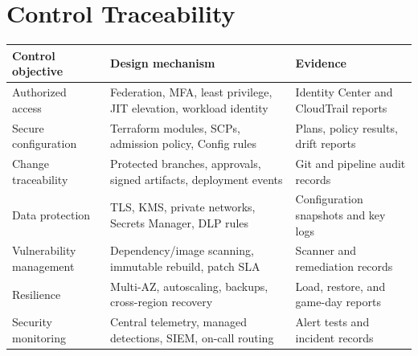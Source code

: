 \section{Control Traceability}

\begin{tabularx}{\textwidth}{@{}L{31mm}Y L{45mm}@{}}
  \toprule
  \color{white}\textbf{Control objective} & \color{white}\textbf{Design mechanism} & \color{white}\textbf{Evidence} \\
  \midrule
  Authorized access & Federation, MFA, least privilege, JIT elevation, workload identity & Identity Center and CloudTrail reports \\
  Secure configuration & Terraform modules, SCPs, admission policy, Config rules & Plans, policy results, drift reports \\
  Change traceability & Protected branches, approvals, signed artifacts, deployment events & Git and pipeline audit records \\
  Data protection & TLS, KMS, private networks, Secrets Manager, DLP rules & Configuration snapshots and key logs \\
  Vulnerability management & Dependency/image scanning, immutable rebuild, patch SLA & Scanner and remediation records \\
  Resilience & Multi-AZ, autoscaling, backups, cross-region recovery & Load, restore, and game-day reports \\
  Security monitoring & Central telemetry, managed detections, SIEM, on-call routing & Alert tests and incident records \\
  \bottomrule
\end{tabularx}

\clearpage

